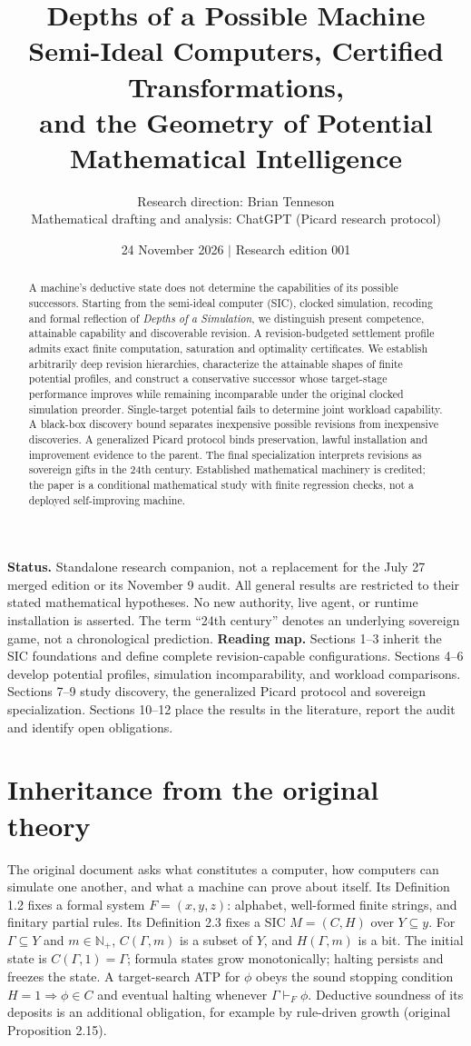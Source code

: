 \documentclass[11pt]{article}
\title{\textbf{Depths of a Possible Machine}\\[5pt]\large Semi-Ideal Computers, Certified Transformations,\\and the Geometry of Potential Mathematical Intelligence}
\author{Research direction: Brian Tenneson\\Mathematical drafting and analysis: ChatGPT (Picard research protocol)}
\date{24 November 2026 $\mid$ Research edition 001}
\theoremstyle{remark}\newtheorem{remark}[theorem]{Remark}
\begin{document}
\maketitle
\begin{abstract}
A machine's deductive state does not determine the capabilities of its possible successors. Starting from the semi-ideal computer (SIC), clocked simulation, recoding and formal reflection of \emph{Depths of a Simulation}, we distinguish present competence, attainable capability and discoverable revision. A revision-budgeted settlement profile admits exact finite computation, saturation and optimality certificates. We establish arbitrarily deep revision hierarchies, characterize the attainable shapes of finite potential profiles, and construct a conservative successor whose target-stage performance improves while remaining incomparable under the original clocked simulation preorder. Single-target potential fails to determine joint workload capability. A black-box discovery bound separates inexpensive possible revisions from inexpensive discoveries. A generalized Picard protocol binds preservation, lawful installation and improvement evidence to the parent. The final specialization interprets revisions as sovereign gifts in the 24th century. Established mathematical machinery is credited; the paper is a conditional mathematical study with finite regression checks, not a deployed self-improving machine.
\end{abstract}
\noindent\textbf{Status.} Standalone research companion, not a replacement for the July 27 merged edition or its November 9 audit. All general results are restricted to their stated mathematical hypotheses. No new authority, live agent, or runtime installation is asserted. The term ``24th century'' denotes an underlying sovereign game, not a chronological prediction.
\medskip
\noindent\textbf{Reading map.} Sections 1--3 inherit the SIC foundations and define complete revision-capable configurations. Sections 4--6 develop potential profiles, simulation incomparability, and workload comparisons. Sections 7--9 study discovery, the generalized Picard protocol and sovereign specialization. Sections 10--12 place the results in the literature, report the audit and identify open obligations.
\newpage
\section{Inheritance from the original theory}
The original document \cite{depths} asks what constitutes a computer, how computers can simulate one another, and what a machine can prove about itself. Its Definition 1.2 fixes a formal system $F=(x,y,z)$: alphabet, well-formed finite strings, and finitary partial rules. Its Definition 2.3 fixes a SIC $M=(C,H)$ over $Y\subseteq y$. For $\Gamma\subseteq Y$ and $m\in\mathbb N_+$, $C(\Gamma,m)$ is a subset of $Y$, and $H(\Gamma,m)$ is a bit. The initial state is $C(\Gamma,1)=\Gamma$; formula states grow monotonically; halting persists and freezes the state. A target-search ATP for $\phi$ obeys the sound stopping condition $H=1\Rightarrow\phi\in C$ and eventual halting whenever $\Gamma\vdash_F\phi$. Deductive soundness of its deposits is an additional obligation, for example by rule-driven growth (original Proposition 2.15).
\end{document}
